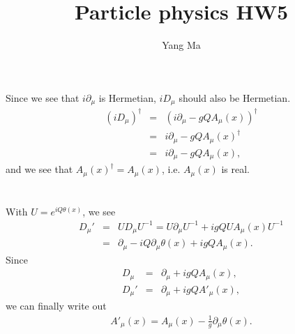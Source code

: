 \documentclass[11pt]{article}
\def\del{{\partial}}
\begin{document}
\title{Particle physics HW5}
\author{Yang Ma}

\maketitle

\section{ }
Since we see that $i \del_\mu$ is Hermetian, $i D_\mu$ should also be Hermetian.
\begin{eqnarray}
    (i D_\mu)^\dagger  &=& (i \del_\mu - g Q A_\mu(x))^\dagger \nonumber \\
    &=& i \del_\mu  - g Q A_\mu(x)^\dagger \nonumber \\
    &=& i \del_\mu  - g Q A_\mu(x),
\end{eqnarray}
and we see that $A_\mu(x)^\dagger = A_\mu(x)$, i.e. $A_\mu(x)$ is real.

\section{ }
With $U=e^{iQ\theta(x)}$, we see 
\begin{eqnarray}
    D_\mu' &=&U D_\mu U^{-1}=U \del_\mu U^{-1}+ igQUA_\mu(x) U^{-1}\\
    &=& \del_\mu -iQ \del_\mu \theta(x) + i g Q A_\mu (x).
\end{eqnarray}
Since 
\begin{eqnarray}
    D_\mu&=&\del_\mu + i g Q A_\mu (x),\\
    D_\mu'&=&\del_\mu + i g Q A'_\mu (x),
\end{eqnarray}
we can finally write out
\begin{eqnarray}
    A'_\mu (x)= A_\mu (x)-\frac{1}{g}\del_\mu \theta(x).
\end{eqnarray}
\end{document}
